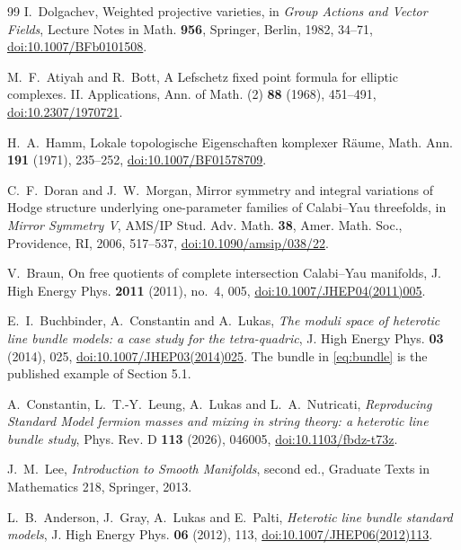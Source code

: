 \begin{thebibliography}{99}
I.~Dolgachev, Weighted projective varieties, in \emph{Group Actions and
Vector Fields}, Lecture Notes in Math. \textbf{956}, Springer, Berlin,
1982, 34--71,
\href{https://doi.org/10.1007/BFb0101508}{doi:10.1007/BFb0101508}.

M.~F.~Atiyah and R.~Bott, A Lefschetz fixed point formula for elliptic
complexes. II. Applications, Ann. of Math. (2) \textbf{88} (1968),
451--491,
\href{https://doi.org/10.2307/1970721}{doi:10.2307/1970721}.

H.~A.~Hamm, Lokale topologische Eigenschaften komplexer R\"aume, Math. Ann.
\textbf{191} (1971), 235--252,
\href{https://doi.org/10.1007/BF01578709}{doi:10.1007/BF01578709}.

C.~F.~Doran and J.~W.~Morgan, Mirror symmetry and integral variations of
Hodge structure underlying one-parameter families of Calabi--Yau
threefolds, in \emph{Mirror Symmetry V}, AMS/IP Stud. Adv. Math.
\textbf{38}, Amer. Math. Soc., Providence, RI, 2006, 517--537,
\href{https://doi.org/10.1090/amsip/038/22}{doi:10.1090/amsip/038/22}.

V.~Braun, On free quotients of complete intersection Calabi--Yau
manifolds, J. High Energy Phys. \textbf{2011} (2011), no.~4, 005,
\href{https://doi.org/10.1007/JHEP04(2011)005}{doi:10.1007/JHEP04(2011)005}.

E.~I.~Buchbinder, A.~Constantin and A.~Lukas,
\emph{The moduli space of heterotic line bundle models: a case study for the
tetra-quadric}, J. High Energy Phys. \textbf{03} (2014), 025,
\href{https://doi.org/10.1007/JHEP03(2014)025}{doi:10.1007/JHEP03(2014)025}.
The bundle in \eqref{eq:bundle} is the published example of Section 5.1.

A.~Constantin, L.~T.-Y.~Leung, A.~Lukas and L.~A.~Nutricati,
\emph{Reproducing Standard Model fermion masses and mixing in string theory:
a heterotic line bundle study}, Phys. Rev. D \textbf{113} (2026), 046005,
\href{https://doi.org/10.1103/fbdz-t73z}{doi:10.1103/fbdz-t73z}.

J.~M.~Lee, \emph{Introduction to Smooth Manifolds},
second ed., Graduate Texts in Mathematics 218, Springer, 2013.

L.~B.~Anderson, J.~Gray, A.~Lukas and E.~Palti,
\emph{Heterotic line bundle standard models},
J. High Energy Phys. \textbf{06} (2012), 113,
\href{https://doi.org/10.1007/JHEP06(2012)113}{doi:10.1007/JHEP06(2012)113}.


\end{thebibliography}
